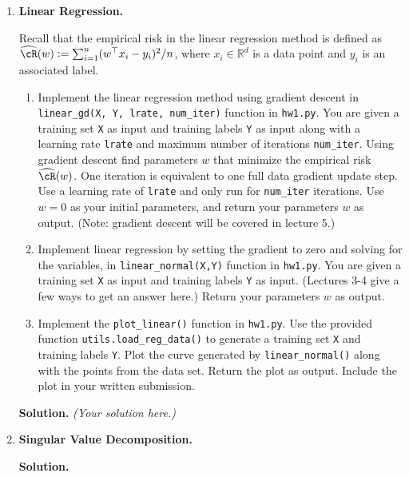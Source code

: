\documentclass{article}
\def\R{\mathbb{R}}
\def\hcR{\widehat{\cR}}
\theoremstyle{definition}
\theoremstyle{remark}
\newenvironment{Q}
        {%
          \clearpage
          \item
        }
        {%
          \phantom{s} %
          \bigskip
          \textbf{Solution.}
        }
\begin{document}
\begin{enumerate}
          \begin{Q}
          \textbf{Linear Regression.}

          Recall that the empirical risk in the linear regression method is defined as $\hcR(w) := \sum_{i=1}^n (w^\top x_i - y_i)^2/n$, where $x_i \in \R^d$ is a data point and $y_i$ is an associated label.
          \begin{enumerate}
            \item Implement the linear regression method using gradient descent in \texttt{linear\_gd(X, Y, lrate, num\_iter)} function in \texttt{hw1.py}. You are given a training set \texttt{X} as input and training labels \texttt{Y} as input along with a learning rate \texttt{lrate} and maximum number of iterations \texttt{num\_iter}.  Using gradient descent find parameters $w$ that minimize the empirical risk $\hcR(w)$.  One iteration is equivalent to one full data gradient update step. Use a learning rate of \texttt{lrate} and only run for \texttt{num\_iter} iterations. Use $w = 0$ as your initial parameters, and return your parameters $w$ as output.  (Note: gradient descent will be covered in lecture 5.)
            \item Implement linear regression by setting the gradient to zero and solving for the variables, in \texttt{linear\_normal(X,Y)} function in \texttt{hw1.py}. You are given a training set \texttt{X} as input and training labels \texttt{Y} as input.  (Lectures 3-4 give a few ways to get an answer here.) Return your parameters $w$ as output.
          \item Implement the \texttt{plot\_linear()} function in \texttt{hw1.py}.  Use the provided function \texttt{utils.load\_reg\_data()} to generate a training set \texttt{X} and training labels \texttt{Y}. Plot the curve generated by \texttt{linear\_normal()} along with the points from the data set.  Return the plot as output.  Include the plot in your written submission.
          \end{enumerate}
          \end{Q}
          \emph{(Your solution here.)}


          \begin{Q}
          \textbf{Singular Value Decomposition.}


\end{Q}
\end{enumerate}
\end{document}
